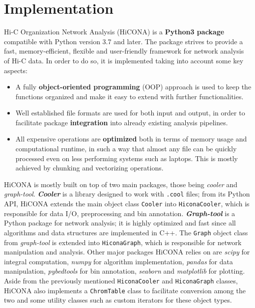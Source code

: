 \section{Implementation}
Hi-C Organization Network Analysis (HiCONA) is a \textbf{Python3 package} compatible with Python version 3.7 and later. The package strives to provide a fast, memory-efficient, flexible and user-friendly framework for network analysis of Hi-C data. In order to do so, it is implemented taking into account some key aspects:
\begin{itemize}\tightlist
  \item A fully \textbf{object-oriented programming} (OOP) approach is used to keep the functions organized and make it easy to extend with further functionalities.
  \item Well established file formats are used for both input and output, in order to facilitate package \textbf{integration} into already existing analysis pipelines.
  \item All expensive operations are \textbf{optimized} both in terms of memory usage and computational runtime, in such a way that almost any file can be quickly processed even on less performing systems such as laptops. This is mostly achieved by chunking and vectorizing operations.
\end{itemize}
HiCONA is mostly built on top of two main packages, those being \emph{cooler} and \emph{graph-tool}. \textbf{\emph{Cooler}} is a library designed to work with \texttt{.cool} files\cite{cooler2020}; from its Python API, HiCONA extends the main object class \texttt{Cooler} into \texttt{HiconaCooler}, which is responsible for data I/O, preprocessing and bin annotation. \textbf{\emph{Graph-tool}} is a Python package for network analysis\cite{graphtool2014}; it is highly optimized and fast since all algorithms and data structures are implemented in C++. The \texttt{Graph} object class from \emph{graph-tool} is extended into \texttt{HiconaGraph}, which is responsible for network manipulation and analysis. Other major packages HiCONA relies on are \emph{scipy}\cite{scipy2020} for integral computation, \emph{numpy}\cite{numpy2020} for algorithm implementation, \emph{pandas}\cite{pandas2020} for data manipulation, \emph{pybedtools}\cite{pybedtools2011} for bin annotation, \emph{seaborn}\cite{seaborn2021} and \emph{matplotlib}\cite{matplotlib2007} for plotting. Aside from the previously mentioned \texttt{HiconaCooler} and \texttt{HiconaGraph} classes, HiCONA also implements a \texttt{ChromTable} class to facilitate conversion among the two and some utility classes such as custom iterators for these object types.

